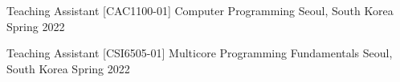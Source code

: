 

\begin{cventries}

  \cventry
    {Teaching Assistant} %
    {[CAC1100-01] Computer Programming} %
    {Seoul, South Korea} %
    {Spring 2022} %
    {}

  \cventry
    {Teaching Assistant} %
    {[CSI6505-01] Multicore Programming Fundamentals} %
    {Seoul, South Korea} %
    {Spring 2022} %
    {}

\end{cventries}
